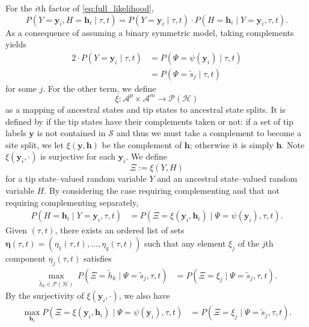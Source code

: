 \documentclass{article}
\newcommand{\alphabet}{\mathcal{A}}
\newcommand{\alignmentColumn}{\mathbf{y}}
\newcommand{\alignmentColumnRV}{Y}
\newcommand{\siteSplit}{\tilde{s}}
\newcommand{\siteSplitSet}{\mathcal{S}}
\newcommand{\ancestralStateColumn}{\mathbf{h}}
\newcommand{\ancestralStateColumnRV}{H}
\newcommand{\ancestralSplit}{\tilde{h}}
\newcommand{\ancestralSplitSet}{\mathcal{H}}
\newcommand{\ancestralSplitPartition}{\eta}
\newcommand{\fullAncestralSplitPartitions}{\boldsymbol\eta}
\newcommand{\patternToSplit}{\psi}
\newcommand{\ancestralToSplit}{\xi}
\newcommand{\siteSplitRV}{\Psi}
\newcommand{\ancestralSplitRV}{\Xi}
\newcommand{\nSiteRows}{m}
\newcommand{\nAncestralStateRows}{p}
\newcommand{\nSiteSplits}{q}
\begin{document}
For the $i$th factor of \eqref{eq:full_likelihood},
$$
P(\alignmentColumnRV=\alignmentColumn_i, \ancestralStateColumnRV=\ancestralStateColumn_i \mid \tau, t) = P(\alignmentColumnRV=\alignmentColumn_i \mid \tau, t) \cdot P(\ancestralStateColumnRV=\ancestralStateColumn_i \mid \alignmentColumnRV=\alignmentColumn_i, \tau, t).
$$
As a consequence of assuming a binary symmetric model, taking complements yields
\begin{align*}
    2\cdot P(\alignmentColumnRV=\alignmentColumn_i \mid \tau, t) &= P(\siteSplitRV=\patternToSplit(\alignmentColumn_i) \mid \tau, t) \\
                                                                 &= P(\siteSplitRV=\siteSplit_j \mid \tau, t)
\end{align*}
for some $j$.
For the other term, we define
$$
\ancestralToSplit:\alphabet^\nAncestralStateRows\times\alphabet^\nSiteRows\rightarrow\mathcal{P}(\ancestralSplitSet)
$$
as a mapping of ancestral states and tip states to ancestral state splits.
It is defined by if the tip states have their complements taken or not: if a set of tip labels $\alignmentColumn$ is not contained in $\siteSplitSet$ and thus we must take a complement to become a site split, we let $\ancestralToSplit(\alignmentColumn, \ancestralStateColumn)$ be the complement of $\ancestralStateColumn$; otherwise it is simply $\ancestralStateColumn$.
Note $\ancestralToSplit(\alignmentColumn_i, \cdot)$ is surjective for each $\alignmentColumn_i$.
We define
$$
\ancestralSplitRV := \ancestralToSplit(\alignmentColumnRV, \ancestralStateColumnRV)
$$
for a tip state--valued random variable $\alignmentColumnRV$ and an ancestral state--valued random variable $\ancestralStateColumnRV$.
By considering the case requiring complementing and that not requiring complementing separately,
\begin{align*}
    P(\ancestralStateColumnRV=\ancestralStateColumn_i \mid \alignmentColumnRV=\alignmentColumn_i, \tau, t) &= P(\ancestralSplitRV=\ancestralToSplit(\alignmentColumn_i, \ancestralStateColumn_i) \mid \siteSplitRV=\patternToSplit(\alignmentColumn_i), \tau, t).
\end{align*}
Given $(\tau, t)$, there exists an ordered list of sets $\fullAncestralSplitPartitions(\tau, t)=(\ancestralSplitPartition_1(\tau, t),\ldots,\ancestralSplitPartition_\nSiteSplits(\tau, t))$ such that any element $\xi_j$ of the $j$th component $\ancestralSplitPartition_j(\tau, t)$ satisfies
\begin{align*}
\max_{\ancestralSplit_k\in\mathcal{P}(\ancestralSplitSet)} \ P(\ancestralSplitRV=\ancestralSplit_k \mid \siteSplitRV=\siteSplit_j, \tau, t) &= P(\ancestralSplitRV = \xi_j \mid \siteSplitRV=\siteSplit_j, \tau, t).
\end{align*}
By the surjectivity of $\ancestralToSplit(\alignmentColumn_i, \cdot)$, we also have
\begin{align*}
\max_{\ancestralStateColumn_i} P(\ancestralSplitRV=\ancestralToSplit(\alignmentColumn_i, \ancestralStateColumn_i) \mid \siteSplitRV=\patternToSplit(\alignmentColumn_i), \tau, t) &= P(\ancestralSplitRV = \xi_j \mid \siteSplitRV=\siteSplit_j, \tau, t).
\end{align*}
\end{document}
